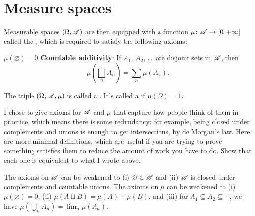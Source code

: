 \section{Measure spaces}
\begin{definition}
	Measurable spaces $(\Omega, \mathscr A)$ are then equipped
	with a function $\mu \colon \mathscr A \to [0, +\infty]$
	called the , which is required to satisfy
	the following axioms:
	\begin{itemize}
		\ii $\mu(\varnothing) = 0$
		\ii \textbf{Countable additivity}:
		If $A_1$, $A_2$, \dots\ are disjoint sets in $\mathscr A$,
		then \[ \mu\left( \bigsqcup_n A_n \right) = \sum_n \mu(A_n). \]
	\end{itemize}
	The triple $(\Omega, \mathscr A, \mu)$ is called a .
	It's called a  if $\mu(\Omega) = 1$.
\end{definition}
\begin{exercise}
	I chose to give axioms for $\mathscr A$ and $\mu$
	that capture how people think of them in practice,
	which means there is some redundancy:
	for example, being closed under complements and unions
	is enough to get intersections, by de Morgan's law.
	Here are more minimal definitions,
	which are useful if you are trying to prove something satisfies them
	to reduce the amount of work you have to do.
	Show that each one is equivalent to what I wrote above.
	\begin{enumerate}[(a)]
		\ii The axioms on $\mathscr A$ can be weakened
		to (i) $\varnothing \in \mathscr A$ and (ii) $\mathscr A$ is closed under
		complements and countable unions.
		\ii The axioms on $\mu$ can be weakened to
		(i) $\mu(\varnothing) = 0$,
		(ii) $\mu(A \sqcup B) = \mu(A) + \mu(B)$, and
		(iii) for $A_1 \subseteq A_2 \subseteq \cdots$,
		we have $\mu\left( \bigcup_n A_n \right) = \lim_n \mu(A_n)$.
	\end{enumerate}
\end{exercise}


